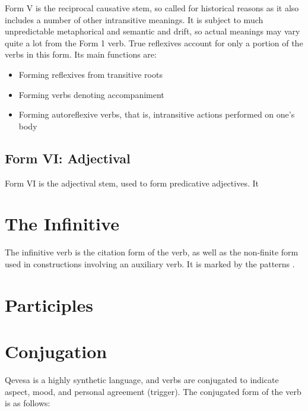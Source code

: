 \documentclass[grammar]{subfiles}
\begin{document}
   Form V is the reciprocal causative stem, so called for historical reasons as
   it also includes a number of other intransitive meanings.  It is subject to
   much unpredictable metaphorical and semantic and drift, so actual meanings
   may vary quite a lot from the Form 1 verb.  True reflexives account for only
   a portion of the verbs in this form.  Its main functions are:
   
   \begin{itemize}
	   \item Forming reflexives from transitive roots 
	   \item Forming verbs denoting accompaniment 
	   \item Forming autoreflexive verbs, that is, intransitive actions performed on one’s body
   \end{itemize}


  \subsection{Form VI: Adjectival}
  \label{ssec:vm_form_vi}

  Form VI is the adjectival stem, used to form predicative adjectives.  It 


  \section{The Infinitive}
  \label{sec:vm_infinitive}

  The infinitive verb is the citation form of the verb, as well as the
  non-finite form used in constructions involving an auxiliary verb.  It is
  marked by the patterns .

  \ToBeWritten

  \section{Participles}


  \section{Conjugation}
  \label{sec:vm_conjugation}

  Qevesa is a highly synthetic language, and verbs are conjugated to indicate
  aspect, mood, and personal agreement (trigger).  The conjugated form of the verb
  is as follows:
\end{document}
